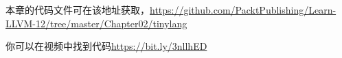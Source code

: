 本章的代码文件可在该地址获取，\url{https://github.com/PacktPublishing/Learn-LLVM-12/tree/master/Chapter02/tinylang} \par

你可以在视频中找到代码\url{https://bit.ly/3nllhED}\par